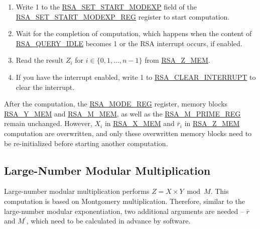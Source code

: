 \documentclass[main\_\_EN.tex]{subfiles}
\begin{document}
\begin{enumerate}
       Users need to write data to each memory block only according to the length of the number; data beyond this length is ignored.

    \item Write 1 to the \hyperref[fielddesc:RSASETSTARTMODEXP]{RSA\_SET\_START\_MODEXP} field of the \hyperref[regdesc:RSASETSTARTMODEXPREG]{RSA\_SET\_START\_MODEXP\_REG} register to start computation.

    \item Wait for the completion of computation, which happens when the content of \hyperref[fielddesc:RSAQUERYIDLE]{RSA\_QUERY\_IDLE} becomes 1 or the RSA interrupt occurs, if enabled.

    \item Read the result \begin{math}Z_{i}\end{math}
        for \begin{math}i \in \{ 0, 1, \dots, n-1 \} \end{math}
        from \hyperref[regdesc:RSAmemory]{RSA\_Z\_MEM}.

    \item If you have the interrupt enabled, write 1 to \hyperref[fielddesc:RSACLEARINTERRUPT]{RSA\_CLEAR\_INTERRUPT} to clear the interrupt.

\end{enumerate}

After the computation, the \hyperref[regdesc:RSAMODEREG]{RSA\_MODE\_REG} register, memory blocks \hyperref[regdesc:RSAmemory]{RSA\_Y\_MEM} and \hyperref[regdesc:RSAmemory]{RSA\_M\_MEM}, as well as the \hyperref[regdesc:RSAMPRIMEREG]{RSA\_M\_PRIME\_REG} remain unchanged. However, \begin{math}X_{i}\end{math} in \hyperref[regdesc:RSAmemory]{RSA\_X\_MEM} and \begin{math}\overline{r}_{i}\end{math} in \hyperref[regdesc:RSAmemory]{RSA\_Z\_MEM} computation are overwritten, and only these overwritten memory blocks need to be re-initialized before starting another computation.

\subsection{Large-Number Modular Multiplication}

Large-number modular multiplication performs \begin{math}Z = X \times Y \bmod M\end{math}. This computation is based on Montgomery multiplication.
Therefore, similar to the large-number modular exponentiation, two additional arguments are needed -- \begin{math}\overline{r}\end{math} and
\begin{math}M^{\prime}\end{math}, which need to be calculated in advance by software.
\end{document}
